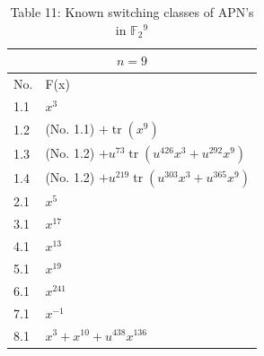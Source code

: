 \documentclass[10pt]{article}
\begin{document}
\begin{table}[h]
\begin{center}
\begin{tabular}{|l|l|}
\hline
\multicolumn{2}{|c|}{$n=9$} \\
\hline
No. & F(x) \\
\hline
1.1 & $x^{3}$ \\
\hline
1.2 & (No. 1.1) $+\operatorname{tr}\left(x^{9}\right)$ \\
\hline
1.3 & (No. 1.2) $+u^{73} \operatorname{tr}\left(u^{426} x^{3}+u^{292} x^{9}\right)$ \\
\hline
1.4 & (No. 1.2) $+u^{219} \operatorname{tr}\left(u^{303} x^{3}+u^{365} x^{9}\right)$ \\
\hline
2.1 & $x^{5}$ \\
\hline
3.1 & $x^{17}$ \\
\hline
4.1 & $x^{13}$ \\
\hline
5.1 & $x^{19}$ \\
\hline
6.1 & $x^{241}$ \\
\hline
7.1 & $x^{-1}$ \\
\hline
8.1 & $x^{3}+x^{10}+u^{438} x^{136}$ \\
\hline
\end{tabular}
\captionsetup{labelformat=empty}
\caption{Table 11: Known switching classes of APN's in $\mathbb{F}_{2}{ }^{9}$}
\end{center}
\end{table}
\end{document}
